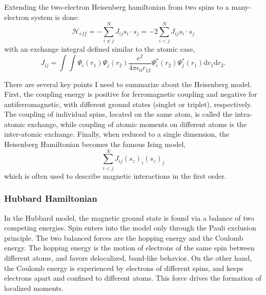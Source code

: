 Extending the two-electron Heisenberg hamiltonian from two spins to a many-electron system is done:
\begin{equation}
\mathscr{H}_{eff}=-\sum_{i\neq j}^N J_{ij} s_i \cdot s_j = -2 \sum_{i<j}^N J_{ij} s_i \cdot s_j
\end{equation}
with an exchange integral defined similar to the atomic case,
\begin{equation}
J_{ij} = \int \int \Psi_i(r_1)\Psi_j(r_2)\frac{e^2}{4\pi\epsilon_0 r_{12}}\Psi_i^*(r_2)\Psi_j^*(r_1)\text{d}r_1\text{d}r_2.
\end{equation}

There are several key points I need to summarize about the Heisenberg model. First, the coupling energy is positive for ferromagnetic coupling and negative for antiferromagnetic, with different ground states (singlet or triplet), respectively. The coupling of individual spins, located on the same atom, is called the intra-atomic exchange, while coupling of atomic moments on different atoms is the inter-atomic exchange. Finally, when reduced to a single dimension, the Heisenberg Hamiltonian becomes the famous Ising model,
\begin{equation}
\sum^N_{i<j} J_{ij}(s_z)_i(s_z)_j
\end{equation}
which is often used to describe magnetic interactions in the first order.

\subsubsection{Hubbard Hamiltonian}

In the Hubbard model, the magnetic ground state is found via a balance of two competing energies. Spin enters into the model only through the Pauli exclusion principle. The two balanced forces are the hopping energy and the Coulomb energy. The hopping energy is the motion of electrons of the same spin between different atoms, and favors delocalized, band-like behavior. On the other hand, the Coulomb energy is experienced by electrons of different spins, and keeps electrons apart and confined to different atoms. This force drives the formation of localized moments.

